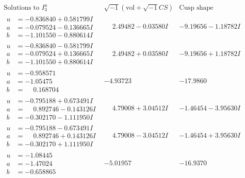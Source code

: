 \documentclass[1p]{elsarticle_modified}
\theoremstyle{definition}
\newcommand{\I}{\sqrt{-1}}
\begin{document}
$$\begin{array}{c|c|c}  
\text{Solutions to }I^u_{3}& \I (\text{vol} + \sqrt{-1}CS) & \text{Cusp shape}\\
 \hline 
\begin{aligned}
u &= -0.836840 + 0.581799 I \\
a &= -0.079524 - 0.136665 I \\
b &= -1.101550 - 0.880614 I\end{aligned}
 & \phantom{-}2.49482 - 0.03580 I & -9.19656 - 1.18782 I \\ \hline\begin{aligned}
u &= -0.836840 - 0.581799 I \\
a &= -0.079524 + 0.136665 I \\
b &= -1.101550 + 0.880614 I\end{aligned}
 & \phantom{-}2.49482 + 0.03580 I & -9.19656 + 1.18782 I \\ \hline\begin{aligned}
u &= -0.958571\phantom{ +0.000000I} \\
a &= -1.05475\phantom{ +0.000000I} \\
b &= \phantom{-}0.168704\phantom{ +0.000000I}\end{aligned}
 & -4.93723\phantom{ +0.000000I} & -17.9860\phantom{ +0.000000I} \\ \hline\begin{aligned}
u &= -0.795188 + 0.673491 I \\
a &= \phantom{-}0.892746 - 0.143126 I \\
b &= -0.302170 - 1.111950 I\end{aligned}
 & \phantom{-}4.79008 + 3.04512 I & -1.46454 - 3.95630 I \\ \hline\begin{aligned}
u &= -0.795188 - 0.673491 I \\
a &= \phantom{-}0.892746 + 0.143126 I \\
b &= -0.302170 + 1.111950 I\end{aligned}
 & \phantom{-}4.79008 - 3.04512 I & -1.46454 + 3.95630 I \\ \hline\begin{aligned}
u &= -1.08445\phantom{ +0.000000I} \\
a &= -1.47024\phantom{ +0.000000I} \\
b &= -0.658865\phantom{ +0.000000I}\end{aligned}
 & -5.01957\phantom{ +0.000000I} & -16.9370\phantom{ +0.000000I} \\ \hline\begin{aligned}

\end{aligned}
\end{array}$$
\end{document}
